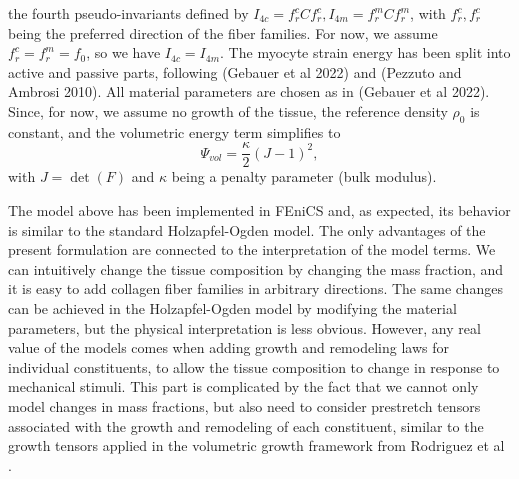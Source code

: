 \documentclass[twoside,12pt,a4paper]{article}
\begin{document}
the fourth pseudo-invariants defined by $I_{4c} = f_r^c C f_r^c, I_{4m} = f_r^m C f_r^m$, with $f_r^c, f_r^c$ 
being the preferred direction of the fiber families. For now, we assume $f_r^c = f_r^m = f_0$, so 
we have $I_{4c} = I_{4m}$. The myocyte strain energy has been split into active and passive parts, following
(Gebauer et al 2022) and (Pezzuto and Ambrosi 2010). All material parameters are 
chosen as in (Gebauer et al 2022). Since, for now, we assume no growth of the tissue, the 
reference density $\rho_0$ is constant, and the volumetric energy term simplifies
to 
\[ 
  \Psi_{vol} = \frac{\kappa}{2}\left(J - 1 \right)^2 ,
\]
with $J= \det(F)$ and $\kappa$ being a penalty parameter (bulk modulus).

The model above has been implemented in FEniCS and, as expected, its behavior is similar to the standard Holzapfel-Ogden model. 
The only advantages of the present formulation are connected to the interpretation of the model terms. We can intuitively
change the tissue composition by changing the mass fraction, and it is easy to add collagen fiber families in arbitrary 
directions. The same changes can be achieved in the Holzapfel-Ogden model by modifying the material parameters, but the physical 
interpretation is less obvious. However, any real value of the models comes when adding growth and remodeling laws for 
individual constituents, to allow the tissue composition to change in response to mechanical stimuli. This part is complicated
by the fact that we cannot only model changes in mass fractions, but also need to consider prestretch tensors associated with 
the growth and remodeling of each constituent, similar to the growth tensors applied in the volumetric 
growth framework from Rodriguez et al \cite{rodriguez1994stress}.
\end{document}
